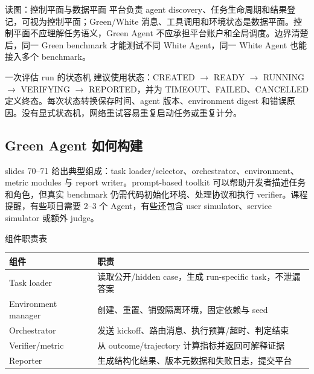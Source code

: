 
\begin{knowledgebox}{读图：控制平面与数据平面}
平台负责 agent discovery、任务生命周期和结果登记，可视为控制平面；Green/White 消息、工具调用和环境状态是数据平面。控制平面不应理解任务语义，Green Agent 不应承担平台账户和全局调度。边界清楚后，同一 Green benchmark 才能测试不同 White Agent，同一 White Agent 也能接入多个 benchmark。
\end{knowledgebox}

\begin{importantbox}{一次评估 run 的状态机}
建议使用状态：CREATED $\rightarrow$ READY $\rightarrow$ RUNNING $\rightarrow$ VERIFYING $\rightarrow$ REPORTED，并为 TIMEOUT、FAILED、CANCELLED 定义终态。每次状态转换保存时间、agent 版本、environment digest 和错误原因。没有显式状态机，网络重试容易重复启动任务或重复计分。
\end{importantbox}

\subsection{Green Agent 如何构建}

slides 70--71 给出典型组成：task loader/selector、orchestrator、environment、metric modules 与 report writer。prompt-based toolkit 可以帮助开发者描述任务和角色，但真实 benchmark 仍需代码初始化环境、处理协议和执行 verifier。课程提醒，有些项目需要 2--3 个 Agent，有些还包含 user simulator、service simulator 或额外 judge。


\begin{knowledgebox}{组件职责表}
\begin{longtable}{p{3cm}p{7.7cm}}
\toprule
\textbf{组件} & \textbf{职责} \\
\midrule
Task loader & 读取公开/hidden case，生成 run-specific task，不泄漏答案 \\
Environment manager & 创建、重置、销毁隔离环境，固定依赖与 seed \\
Orchestrator & 发送 kickoff、路由消息、执行预算/超时、判定结束 \\
Verifier/metric & 从 outcome/trajectory 计算指标并返回可解释证据 \\
Reporter & 生成结构化结果、版本元数据和失败日志，提交平台 \\
\bottomrule
\end{longtable}
\end{knowledgebox}

